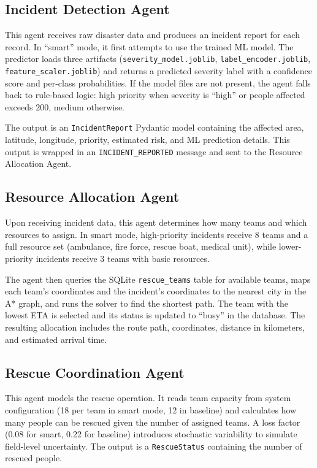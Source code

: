 \subsection{Incident Detection Agent}

This agent receives raw disaster data and produces an incident report for each record. In ``smart'' mode, it first attempts to use the trained ML model. The predictor loads three artifacts (\texttt{severity\_model.joblib}, \texttt{label\_encoder.joblib}, \texttt{feature\_scaler.joblib}) and returns a predicted severity label with a confidence score and per-class probabilities. If the model files are not present, the agent falls back to rule-based logic: high priority when severity is ``high'' or people affected exceeds 200, medium otherwise.

The output is an \texttt{IncidentReport} Pydantic model containing the affected area, latitude, longitude, priority, estimated risk, and ML prediction details. This output is wrapped in an \texttt{INCIDENT\_REPORTED} message and sent to the Resource Allocation Agent.

\subsection{Resource Allocation Agent}

Upon receiving incident data, this agent determines how many teams and which resources to assign. In smart mode, high-priority incidents receive 8 teams and a full resource set (ambulance, fire force, rescue boat, medical unit), while lower-priority incidents receive 3 teams with basic resources.

The agent then queries the SQLite \texttt{rescue\_teams} table for available teams, maps each team's coordinates and the incident's coordinates to the nearest city in the A* graph, and runs the solver to find the shortest path. The team with the lowest ETA is selected and its status is updated to ``busy'' in the database. The resulting allocation includes the route path, coordinates, distance in kilometers, and estimated arrival time.

\subsection{Rescue Coordination Agent}

This agent models the rescue operation. It reads team capacity from system configuration (18 per team in smart mode, 12 in baseline) and calculates how many people can be rescued given the number of assigned teams. A loss factor (0.08 for smart, 0.22 for baseline) introduces stochastic variability to simulate field-level uncertainty. The output is a \texttt{RescueStatus} containing the number of rescued people.

